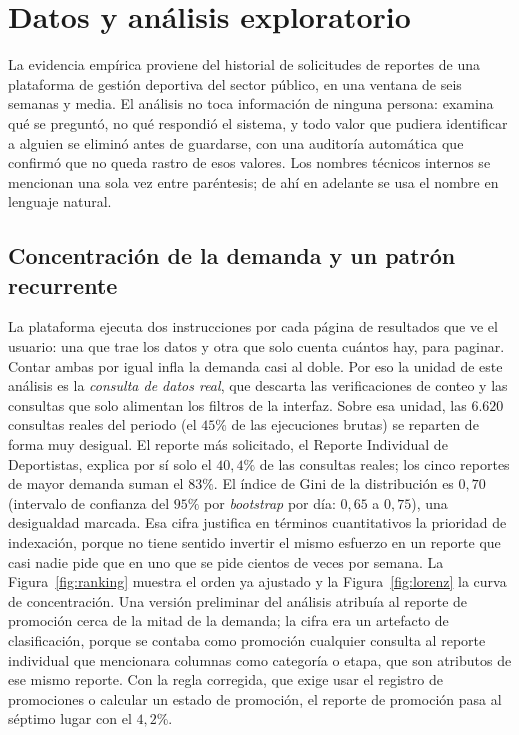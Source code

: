 \documentclass[11pt,letterpaper]{article}
\numberwithin{equation}{section}
\begin{document}
\section{Datos y análisis exploratorio}
\label{sec:datos}
La evidencia empírica proviene del historial de solicitudes de reportes de una plataforma de gestión deportiva del sector público, en una ventana de seis semanas y media. El análisis no toca información de ninguna persona: examina qué se preguntó, no qué respondió el sistema, y todo valor que pudiera identificar a alguien se eliminó antes de guardarse, con una auditoría automática que confirmó que no queda rastro de esos valores. Los nombres técnicos internos se mencionan una sola vez entre paréntesis; de ahí en adelante se usa el nombre en lenguaje natural.

\subsection{Concentración de la demanda y un patrón recurrente}
La plataforma ejecuta dos instrucciones por cada página de resultados que ve el usuario: una que trae los datos y otra que solo cuenta cuántos hay, para paginar. Contar ambas por igual infla la demanda casi al doble. Por eso la unidad de este análisis es la \emph{consulta de datos real}, que descarta las verificaciones de conteo y las consultas que solo alimentan los filtros de la interfaz. Sobre esa unidad, las $6.620$ consultas reales del periodo (el $45\%$ de las ejecuciones brutas) se reparten de forma muy desigual. El reporte más solicitado, el Reporte Individual de Deportistas, explica por sí solo el $40{,}4\%$ de las consultas reales; los cinco reportes de mayor demanda suman el $83\%$. El índice de Gini de la distribución es $0{,}70$ (intervalo de confianza del $95\%$ por \textit{bootstrap} por día: $0{,}65$ a $0{,}75$), una desigualdad marcada. Esa cifra justifica en términos cuantitativos la prioridad de indexación, porque no tiene sentido invertir el mismo esfuerzo en un reporte que casi nadie pide que en uno que se pide cientos de veces por semana. La Figura~\ref{fig:ranking} muestra el orden ya ajustado y la Figura~\ref{fig:lorenz} la curva de concentración. Una versión preliminar del análisis atribuía al reporte de promoción cerca de la mitad de la demanda; la cifra era un artefacto de clasificación, porque se contaba como promoción cualquier consulta al reporte individual que mencionara columnas como categoría o etapa, que son atributos de ese mismo reporte. Con la regla corregida, que exige usar el registro de promociones o calcular un estado de promoción, el reporte de promoción pasa al séptimo lugar con el $4{,}2\%$.
\end{document}
